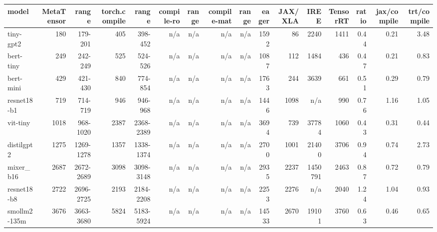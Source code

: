 \begin{tabular}{lrrrrrrrrrrrrrrr}
\toprule
model & MetaTensor & range & torch.compile & range & compile-ro & range & compile-mat & range & eager & JAX/XLA & IREE & TensorRT & ratio & jax/compile & trt/compile \\
\midrule
tiny-gpt2 & 180 & 179-201 & 405 & 398-452 & n/a & n/a & n/a & n/a & 1592 & 86 & 2240 & 1411 & 0.44 & 0.21 & 3.48 \\
bert-tiny & 249 & 242-249 & 525 & 524-526 & n/a & n/a & n/a & n/a & 1087 & 112 & 1484 & 436 & 0.47 & 0.21 & 0.83 \\
bert-mini & 429 & 421-430 & 840 & 774-854 & n/a & n/a & n/a & n/a & 1763 & 244 & 3639 & 661 & 0.51 & 0.29 & 0.79 \\
resnet18-b1 & 719 & 714-719 & 946 & 946-968 & n/a & n/a & n/a & n/a & 1446 & 1098 & n/a & 990 & 0.76 & 1.16 & 1.05 \\
vit-tiny & 1018 & 968-1020 & 2387 & 2368-2389 & n/a & n/a & n/a & n/a & 3694 & 739 & 37784 & 1060 & 0.43 & 0.31 & 0.44 \\
distilgpt2 & 1275 & 1269-1278 & 1357 & 1338-1374 & n/a & n/a & n/a & n/a & 2700 & 1001 & 21400 & 3706 & 0.94 & 0.74 & 2.73 \\
mixer\_b16 & 2687 & 2672-2689 & 3098 & 3098-3148 & n/a & n/a & n/a & n/a & 2935 & 2237 & 1450791 & 2463 & 0.87 & 0.72 & 0.79 \\
resnet18-b8 & 2722 & 2696-2725 & 2193 & 2184-2208 & n/a & n/a & n/a & n/a & 2253 & 2276 & n/a & 2040 & 1.24 & 1.04 & 0.93 \\
smollm2-135m & 3676 & 3663-3680 & 5824 & 5183-5924 & n/a & n/a & n/a & n/a & 14533 & 2670 & 19101 & 3760 & 0.63 & 0.46 & 0.65 \\
\bottomrule
\end{tabular}
